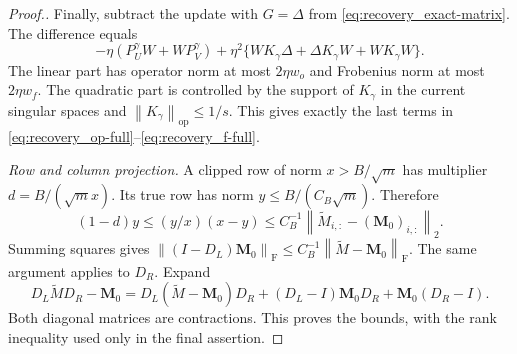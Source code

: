 \documentclass[numsec,webpdf,modern,large,namedate]{oup-authoring-template}
\theoremstyle{plain}
\theoremstyle{remark}
\newcommand{\M}{\bm{M}}
\providecommand{\op}{\mathrm{op}}
\providecommand{\F}{\mathrm{F}}
\providecommand{\norm}[1]{\left\|#1\right\|}
\newif\ifmarkchanges
\newenvironment{revision}{\begingroup\ifmarkchanges\color{red}\fi}{\endgroup}
\begin{document}
\begin{revision}
\begin{proof}[Proof.]
Finally, subtract the update with $G=\Delta$ from \eqref{eq:recovery_exact-matrix}.
The difference equals
\[
 -\eta(P_U^\gamma W+W P_V^\gamma)
 +\eta^2\{W K_\gamma\Delta+\Delta K_\gamma W+W K_\gamma W\}.
\]
The linear part has operator norm at most $2\eta w_o$ and Frobenius norm
at most $2\eta w_f$.  The quadratic part is controlled by the support of
$K_\gamma$ in the current singular spaces and $\norm{K_\gamma}_\op\le1/s$.
This gives exactly the last terms in \eqref{eq:recovery_op-full}--\eqref{eq:recovery_f-full}.

\textit{Row and column projection.} A clipped row of norm $x>B/\sqrt m$ has multiplier $d=B/(\sqrt m x)$.
Its true row has norm $y\le B/(C_B\sqrt m)$.  Therefore
\[
 (1-d)y\le(y/x)(x-y)\le C_B^{-1}
 \norm{\widetilde M_{i,:}-(\M_0)_{i,:}}_2.
\]
Summing squares gives
$\norm{(I-D_L)\M_0}_\F\le C_B^{-1}
\norm{\widetilde M-\M_0}_\F$.  The same argument applies to $D_R$.
Expand
\[
 D_L\widetilde M D_R-\M_0
 =D_L(\widetilde M-\M_0)D_R
 +(D_L-I)\M_0 D_R+\M_0(D_R-I).
\]
Both diagonal matrices are contractions.  This proves the bounds, with the
rank inequality used only in the final assertion.
\end{proof}
\end{revision}
\end{document}
